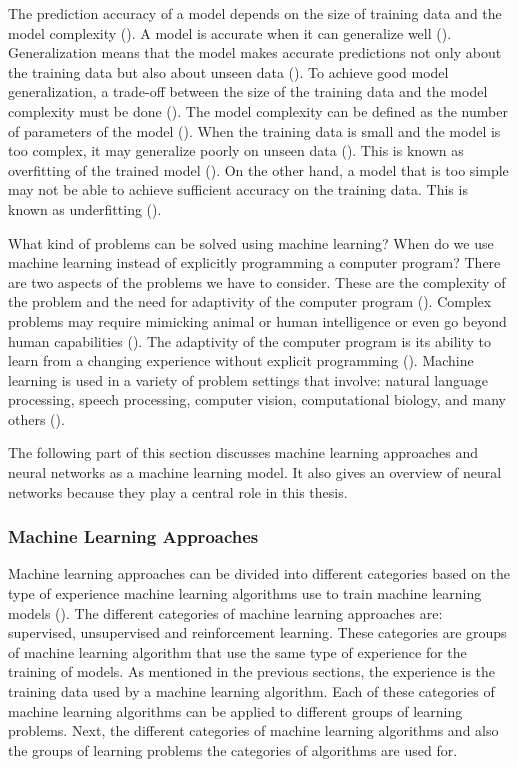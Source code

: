 \documentclass{BachelorBUI}
\begin{document}
        The prediction accuracy of a model depends on the size of training data and the model complexity (\cite{Murphy:2022}). A model is accurate when it can generalize well (\cite{Mohri:2018}). Generalization means that the model makes accurate predictions not only about the training data but also about unseen data (\cite{Bishop:2006}). To achieve good model generalization, a trade-off between the size of the training data and the model complexity must be done (\cite{Bishop:2006,Mohri:2018}). The model complexity can be defined as the number of parameters of the model (\cite{Bishop:2006}). When the training data is small and the model is too complex, it may generalize poorly on unseen data (\cite{Mohri:2018}). This is known as overfitting of the trained model (\cite{Mohri:2018}). On the other hand, a model that is too simple may not be able to achieve sufficient accuracy on the training data. This is known as underfitting (\cite{Mohri:2018}). 

        What kind of problems can be solved using machine learning? When do we use machine learning instead of explicitly programming a computer program? There are two aspects of the problems we have to consider. These are the complexity of the problem and the need for adaptivity of the computer program (\cite{Shalev-Shwart:2014}). Complex problems may require mimicking animal or human intelligence or even go beyond human capabilities (\cite{Shalev-Shwart:2014}). The adaptivity of the computer program is its ability to learn from a changing experience without explicit programming (\cite{Shalev-Shwart:2014}). Machine learning is used in a variety of problem settings that involve: natural language processing, speech processing, computer vision, computational biology, and many others (\cite{Mohri:2018}).

        The following part of this section discusses machine learning approaches and neural networks as a machine learning model. It also gives an overview of neural networks because they play a central role in this thesis.

        \subsubsection{Machine Learning Approaches}

            Machine learning approaches can be divided into different categories based on the type of experience machine learning algorithms use to train machine learning models (\cite{Goodfellow:2016}). The different categories of machine learning approaches are: supervised, unsupervised and reinforcement learning. These categories are groups of machine learning algorithm that use the same type of experience for the training of models. As mentioned in the previous sections, the experience is the training data used by a machine learning algorithm. Each of these categories of machine learning algorithms can be applied to different groups of learning problems. Next, the different categories of machine learning algorithms and also the groups of learning problems the categories of algorithms are used for.
    
\end{document}
